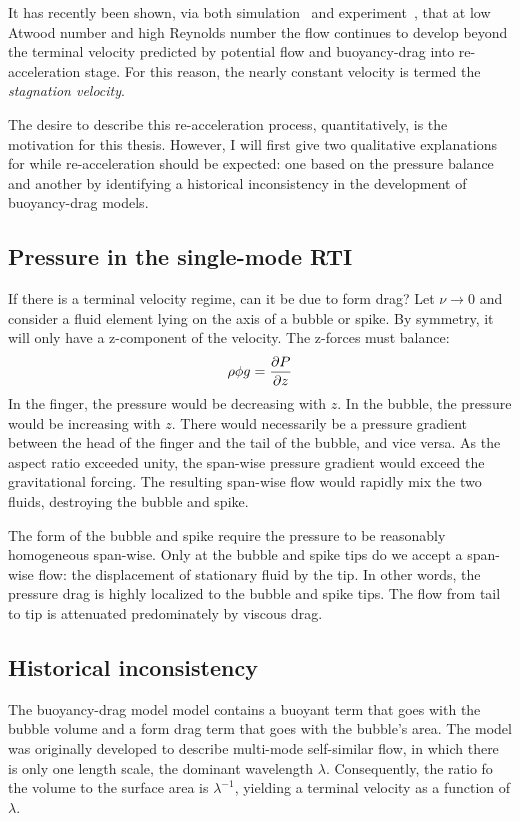 It has recently been shown, via both simulation~\cite{Ramaprabhu2006} and experiment~\cite{Wilkinson2007}, that at low Atwood number and high Reynolds number the flow continues to develop beyond the terminal velocity predicted by potential flow and buoyancy-drag into re-acceleration stage.
For this reason, the nearly constant velocity is termed the \textit{stagnation velocity}.

The desire to describe this re-acceleration process, quantitatively, is the motivation for this thesis.
However, I will first give two qualitative explanations for while re-acceleration should be expected: one based on the pressure balance and another by identifying a historical inconsistency in the development of buoyancy-drag models.

\subsection{Pressure in the single-mode RTI}

If there is a terminal velocity regime, can it be due to form drag?
Let $\nu \rightarrow 0$ and consider a fluid element lying on the axis
of a bubble or spike.
By symmetry, it will only have a z-component of the velocity.
The z-forces must balance:
$$ \rho \phi g = \frac{\partial P}{\partial z} $$
In the finger, the pressure would be decreasing with $z$.
In the bubble, the pressure would be increasing with $z$.
There would necessarily be a pressure gradient between the head of the finger and the tail of the bubble, and vice versa.
As the aspect ratio exceeded unity, the span-wise pressure gradient would exceed the gravitational forcing.
The resulting span-wise flow would rapidly mix the two fluids, destroying the bubble and spike.

The form of the bubble and spike require the pressure to be reasonably homogeneous span-wise.
Only at the bubble and spike tips do we accept a span-wise flow: the displacement of stationary fluid by the tip.
In other words, the pressure drag is highly localized to the bubble and spike tips.
The flow from tail to tip is attenuated predominately by viscous drag.

\subsection{Historical inconsistency}

The buoyancy-drag model model contains a buoyant term that goes with the bubble volume and a form drag term that goes with the bubble's area.
The model was originally developed to describe multi-mode self-similar flow, in which there is only one length scale, the dominant wavelength $\lambda$.
Consequently, the ratio fo the volume to the surface area is $\lambda^{-1}$, yielding a terminal velocity as a function of $\lambda$.

